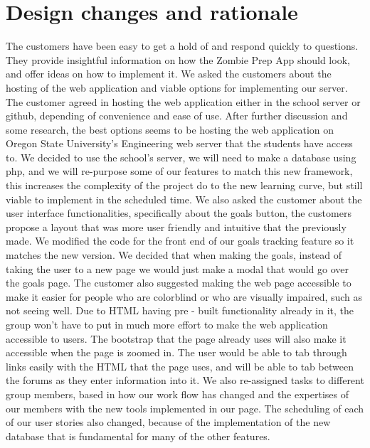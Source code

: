\documentclass[a4paper]{article}
\begin{document}
\section{Design changes and rationale}
The customers have been easy to get a hold of and respond quickly to questions. They provide insightful information on how the Zombie Prep App should look, and offer ideas on how to implement it. 
\newline
\newline
We asked the customers about the hosting of the web application and  viable options for  implementing our server. The customer agreed in hosting the web application either in the school server or github, depending of convenience and ease of use. After further discussion and some research, the best options seems to be hosting the web application on Oregon State University's Engineering web server that the students have access to. 
\newline
\newline
We decided to use the school's server, we will need to make a database using php, and we will  re-purpose some of our features to match this new framework, this increases the complexity of the project do to the new learning curve, but still viable to implement in the scheduled time. 
\newline
\newline
We also asked the customer about the user interface functionalities, specifically about the goals button, the customers propose a layout that was more user friendly and intuitive that the previously made. We modified the code for the front end of our goals tracking feature so it matches the new version. 
\newline
\newline
We decided that when making the goals, instead of taking the user to a new page we would just make a modal that would go over the goals page. 
\newline
\newline
The customer also suggested making the web page accessible to make it easier for people who are colorblind or who are visually impaired, such as not seeing well. Due to HTML having pre - built functionality already in it, the group won't have to put in much more effort to make the web application accessible to users. The bootstrap that the page already uses will also make it accessible when the page is zoomed in. The user would be able to tab through links easily with the HTML that the page uses, and will be able to tab between the forums as they enter information into it. 
\newline
\newline
We also re-assigned tasks to different group members, based in how our work flow has changed and the expertises of our members with the new tools implemented in our page. The scheduling of each of our user stories also changed, because of the implementation of the new database that is fundamental for many of the other features. 
\end{document}
